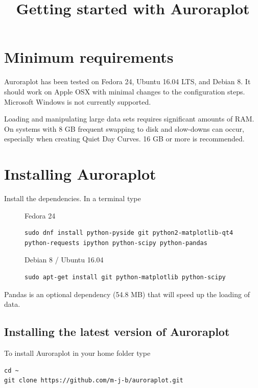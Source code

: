 \documentclass{article}
\begin{document}
\title{Getting started with Auroraplot}
\date{}
\maketitle

\section{Minimum requirements}
Auroraplot has been tested on Fedora 24, Ubuntu 16.04 LTS, and Debian 8.
It should work on Apple OSX with minimal changes to the configuration steps.
Microsoft Windows is not currently supported.

Loading and manipulating large data sets requires significant amounts of RAM.
On systems with 8 GB frequent swapping to disk and slow-downs can occur,
especially when creating Quiet Day Curves. 16 GB or more is recommended.

\section{Installing Auroraplot}

Install the dependencies. In a terminal type

\begin{figure}[htb!]
\begin{minipage}[b]{0.45\linewidth}
Fedora 24
\begin{lstlisting}
sudo dnf install python-pyside git python2-matplotlib-qt4 python-requests ipython python-scipy python-pandas
\end{lstlisting}
\end{minipage}
\hspace{0.5cm}
\begin{minipage}[b]{0.45\linewidth}
Debian 8 / Ubuntu 16.04
\begin{lstlisting}                 
sudo apt-get install git python-matplotlib python-scipy 
\end{lstlisting}
\end{minipage} 
\end{figure}

Pandas is an optional dependency (54.8 MB) that will speed up the loading of data.

\subsection{Installing the latest version of Auroraplot}
To install Auroraplot in your home folder type
\begin{lstlisting}
cd ~
git clone https://github.com/m-j-b/auroraplot.git
\end{lstlisting}
\end{document}
